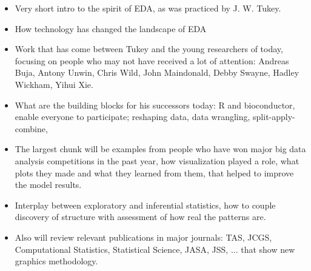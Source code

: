 \documentclass{article}
\begin{document}
\begin{itemize} \itemsep 0in
\item Very short intro to the spirit of EDA, as was practiced by J. W. Tukey.

\item How technology has changed the landscape of EDA

\item Work that has come between Tukey and the young researchers of today, focusing on people who may not have received a lot of attention: Andreas Buja, Antony Unwin, Chris Wild, John Maindonald, Debby Swayne, Hadley Wickham, Yihui Xie.

\item What are the building blocks for his successors today: R and bioconductor, enable everyone to participate; reshaping data, data wrangling, split-apply-combine,

\item The largest chunk will be examples from people who have won major big data analysis competitions in the past year, how visualization played a role,  what plots they made and what they learned from them, that helped to improve the model results.

\item Interplay between exploratory and inferential statistics, how to couple discovery of structure with assessment of how real the patterns are.

\item Also will review relevant publications in major journals: TAS, JCGS, Computational Statistics, Statistical Science, JASA, JSS, ... that show new graphics methodology.

\end{itemize}



\end{document}
